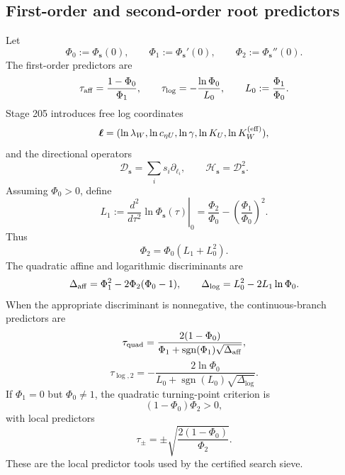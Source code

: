 \subsection{First-order and second-order root predictors}
\label{subsec:app-part06-root-predictors}

Let
\begin{equation}
\label{eq:app-part06-Phi012}
\Phi_0:=\Phi_{\mathbf s}(0),
\qquad
\Phi_1:=\Phi_{\mathbf s}'(0),
\qquad
\Phi_2:=\Phi_{\mathbf s}''(0).
\end{equation}
The first-order predictors are
\begin{equation}
\label{eq:app-part06-aff-log-predictors}
\tau_{\rm aff}=\frac{1-\Phi_0}{\Phi_1},
\qquad
\tau_{\log}=-\frac{\ln\Phi_0}{L_0},
\qquad
L_0:=\frac{\Phi_1}{\Phi_0}.
\end{equation}
Stage 205 introduces free log coordinates
\begin{equation}
\label{eq:app-part06-free-log-coords}
\boldsymbol\ell=(\ln\lambda_W,\ln c_{\eta U},\ln\gamma,\ln K_U,\ln K_W^{(\rm eff)}),
\end{equation}
and the directional operators
\begin{equation}
\label{eq:app-part06-directional-operators}
\mathcal D_{\mathbf s}=\sum_i s_i\partial_{\ell_i},
\qquad
\mathcal H_{\mathbf s}=\mathcal D_{\mathbf s}^2.
\end{equation}
Assuming \(\Phi_0>0\), define
\begin{equation}
\label{eq:app-part06-log-curvature}
L_1:=\left.\frac{d^2}{d\tau^2}\ln\Phi_{\mathbf s}(\tau)\right|_{0}
=\frac{\Phi_2}{\Phi_0}-\left(\frac{\Phi_1}{\Phi_0}\right)^2.
\end{equation}
Thus
\begin{equation}
\label{eq:app-part06-Phi-log-identity}
\Phi_2=\Phi_0(L_1+L_0^2).
\end{equation}
The quadratic affine and logarithmic discriminants are
\begin{equation}
\label{eq:app-part06-quadratic-discriminants}
\Delta_{\rm aff}=\Phi_1^2-2\Phi_2(\Phi_0-1),
\qquad
\Delta_{\log}=L_0^2-2L_1\ln\Phi_0.
\end{equation}
When the appropriate discriminant is nonnegative, the continuous-branch predictors are
\begin{equation}
\label{eq:app-part06-quadratic-affine-predictor}
\tau_{\rm quad}=
\frac{2(1-\Phi_0)}{\Phi_1+\operatorname{sgn}(\Phi_1)\sqrt{\Delta_{\rm aff}}},
\end{equation}
\begin{equation}
\label{eq:app-part06-quadratic-log-predictor}
\tau_{\log,2}=
-\frac{2\ln\Phi_0}{L_0+\operatorname{sgn}(L_0)\sqrt{\Delta_{\log}}}.
\end{equation}
If \(\Phi_1=0\) but \(\Phi_0\neq1\), the quadratic turning-point criterion is
\begin{equation}
\label{eq:app-part06-turning-criterion}
(1-\Phi_0)\Phi_2>0,
\end{equation}
with local predictors
\begin{equation}
\label{eq:app-part06-turning-predictors}
\tau_\pm=\pm\sqrt{\frac{2(1-\Phi_0)}{\Phi_2}}.
\end{equation}
These are the local predictor tools used by the certified search sieve.

